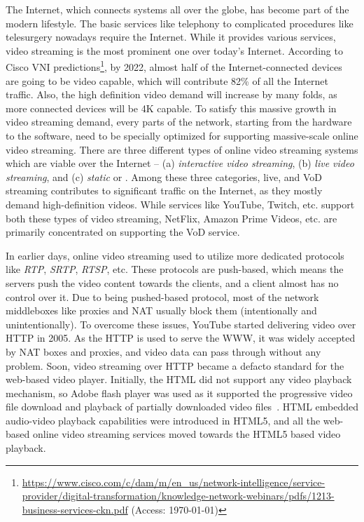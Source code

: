 The Internet, which connects systems all over the globe, has become part of the modern lifestyle. The basic services like telephony to complicated procedures like telesurgery nowadays require the Internet. While it provides various services, video streaming is the most prominent one over today's Internet. According to Cisco \ac{VNI} predictions\footnote{\url{https://www.cisco.com/c/dam/m/en_us/network-intelligence/service-provider/digital-transformation/knowledge-network-webinars/pdfs/1213-business-services-ckn.pdf} (Access: \today)}, by 2022, almost half of the Internet-connected devices are going to be video capable, which will contribute 82\% of all the Internet traffic. Also, the high definition video demand will increase by many folds, as more connected devices will be 4K capable. To satisfy this massive growth in video streaming demand, every parts of the network, starting from the hardware to the software, need to be specially optimized for supporting massive-scale online video streaming. There are three different types of online video streaming systems which are viable over the Internet -- (a) \textit{interactive video streaming}, (b) \textit{live video streaming}, and (c) \textit{static} or . Among these three categories, live, and \ac{VoD} streaming contributes to significant traffic on the Internet, as they mostly demand high-definition videos. While services like YouTube, Twitch, etc. support both these types of video streaming, NetFlix, Amazon Prime Videos, etc. are primarily concentrated on supporting the \ac{VoD} service. 

In earlier days, online video streaming used to utilize more dedicated protocols like \textit{\ac{RTP}}, \textit{\ac{SRTP}}, \textit{\ac{RTSP}}, etc. These protocols are push-based, which means the servers push the video content towards the clients, and a client almost has no control over it. Due to being pushed-based protocol, most of the network middleboxes like proxies and \ac{NAT} usually block them (intentionally and unintentionally). To overcome these issues, YouTube started delivering video over \ac{HTTP} in 2005. As the \ac{HTTP} is used to serve the \ac{WWW}, it was widely accepted by \ac{NAT} boxes and proxies, and video data can pass through without any problem. Soon, video streaming over \ac{HTTP} became a defacto standard for the web-based video player. Initially, the \ac{HTML} did not support any video playback mechanism, so Adobe flash player was used as it supported the progressive video file download and playback of partially downloaded video files~\cite{gill2007youtube}. \ac{HTML} embedded audio-video playback capabilities were introduced in \ac{HTML5}, and all the web-based online video streaming services moved towards the \ac{HTML5} based video playback.

